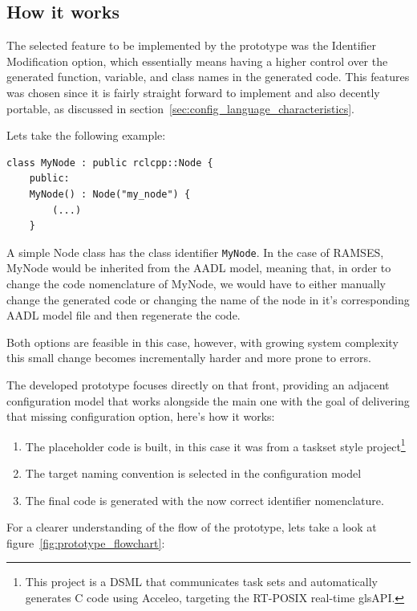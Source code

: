 \subsection{How it works}
\label{sec:how_it_works}

The selected feature to be implemented by the prototype was the Identifier Modification option, which essentially means having a higher control over the generated function, variable, and class names in the generated code. This features was chosen since it is fairly straight forward to implement and also decently portable, as discussed in section~\ref{sec:config_language_characteristics}. 

Lets take the following example:

\begin{verbatim}
class MyNode : public rclcpp::Node {
	public:
	MyNode() : Node("my_node") {
		(...)
	}
\end{verbatim}

A simple Node class has the class identifier \texttt{MyNode}. In the case of \gls{RAMSES}, MyNode would be inherited from the \gls{AADL} model, meaning that, in order to change the code nomenclature of MyNode, we would have to either manually change the generated code or changing the name of the node in it's corresponding \gls{AADL} model file and then regenerate the code.

Both options are feasible in this case, however, with growing system complexity this small change becomes incrementally harder and more prone to errors.

The developed prototype focuses directly on that front, providing an adjacent configuration model that works alongside the main one with the goal of delivering that missing configuration option, here's how it works:

\begin{enumerate}
	\item The placeholder code is built, in this case it was from a taskset style project\footnote{This project is a \gls{DSML} that communicates task sets and automatically generates C code using Acceleo, targeting the RT-POSIX real-time gls{API}.}
	\item The target naming convention is selected in the configuration model
	\item The final code is generated with the now correct identifier nomenclature.
\end{enumerate}
 
 
For a clearer understanding of the flow of the prototype, lets take a look at figure~\ref{fig:prototype_flowchart}:

